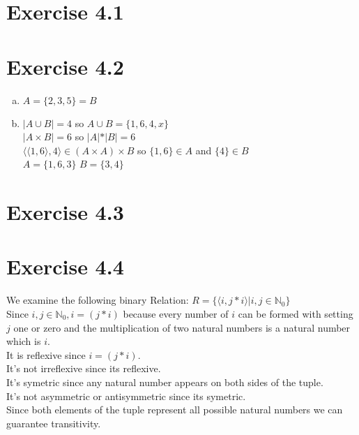 \documentclass{article} %
\newcommand{\homeworkNumber}{4}
\begin{document}
\section*{Exercise \homeworkNumber.1}

\section*{Exercise \homeworkNumber.2}
\begin{enumerate}[(a)]
    \item $A = \{2,3,5\} = B$
    \item $\lvert A \cup B\lvert = 4$  so $A \cup B = \{1,6,4,x\}$ \\
        $\lvert A \times B \lvert = 6$ so $\lvert A\lvert  * \lvert B\lvert  = 6$ \\
        $\langle\langle 1,6 \rangle,4\rangle \in (A \times A) \times B$ so $ \{1,6\} \in A$ and $ \{4\} \in B$ \\
        $ A = \{1,6,3\}$ $B = \{3,4\}$
\end{enumerate}
\section*{Exercise \homeworkNumber.3}

\section*{Exercise \homeworkNumber.4}
We examine the following binary Relation: $R = \{ \langle i,j*i \rangle \lvert i,j \in \mathbb N_0\}$ \\
Since $ i,j \in \mathbb N_0 , i = (j*i)$ because every number of $i$ can be formed with setting $j$ one or zero and the multiplication of two natural numbers is a natural number which is $i$.\\
It is reflexive since $i = (j*i)$. \\
It's not irreflexive since its reflexive. \\
It's symetric since any natural number appears on both sides of the tuple. \\
It's not asymmetric or antisymmetric since its symetric. \\
Since both elements of the tuple represent all possible natural numbers we can guarantee transitivity. \\
\end{document}
